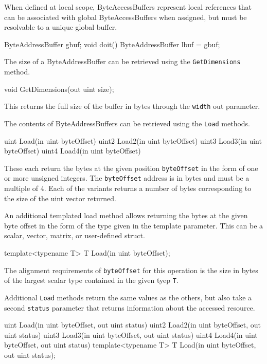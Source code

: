 When defined at local scope, ByteAccessBuffers represent local references
that can be associated with global ByteAccessBuffers when assigned,
but must be resolvable to a unique global buffer.

\begin{HLSL}
  ByteAddressBuffer gbuf;
  void doit() {
    ByteAddressBuffer lbuf = gbuf;
  }
\end{HLSL}


The size of a ByteAddressBuffer can be retrieved using the \texttt{GetDimensions} method.
\begin{HLSL}
void GetDimensions(out uint size);
\end{HLSL}

This returns the full size of the buffer in bytes through the \texttt{width} out parameter.


The contents of ByteAddressBuffers can be retrieved using the \texttt{Load} methods.

\begin{HLSL}
 uint Load(in uint byteOffset)
 uint2 Load2(in uint byteOffset)
 uint3 Load3(in uint byteOffset)
 uint4 Load4(in uint byteOffset)
\end{HLSL}

These each return the bytes at the given position \texttt{byteOffset} in the form of one or more unsigned integers.
The \texttt{byteOffset} address is in bytes and must be a multiple of 4.
Each of the variants returns a number of bytes corresponding to the size of the uint vector returned.

An additional templated load method allows returning the bytes at the given byte offset in the form
of the type given in the template parameter. This can be a scalar, vector, matrix, or user-defined struct.

\begin{HLSL}
  template<typename T>
  T Load(in uint byteOffset);
\end{HLSL}

The alignment requirements of \texttt{byteOffset} for this operation is the size in bytes of the largest
scalar type contained in the given tyep \texttt{T}.

Additional \texttt{Load} methods return the same values as the others,
but also take a second \texttt{status} parameter that returns information about the accessed resource.
\begin{HLSL}
  uint Load(in uint byteOffset, out uint status)
  uint2 Load2(in uint byteOffset, out uint status)
  uint3 Load3(in uint byteOffset, out uint status)
  uint4 Load4(in uint byteOffset, out uint status)
  template<typename T>
  T Load(in uint byteOffset, out uint status);
\end{HLSL}

